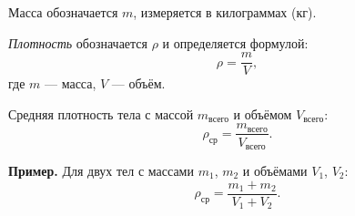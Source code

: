 \documentclass[12 pt, a4paper]{article}
\begin{document}
Масса обозначается $m$, измеряется в килограммах (кг).

\textit{Плотность} обозначается $\rho$ и определяется формулой:
\[
\rho = \frac{m}{V},
\]
где $m$ — масса, $V$ — объём.

Средняя плотность тела с массой $m_{\text{всего}}$ и объёмом $V_{\text{всего}}$:
\[
\rho_{\text{ср}} = \frac{m_{\text{всего}}}{V_{\text{всего}}}.
\]

\textbf{Пример.} Для двух тел с массами $m_1$, $m_2$ и объёмами $V_1$, $V_2$:
\[
\rho_{\text{ср}} = \frac{m_1 + m_2}{V_1 + V_2}.
\]
\end{document}
